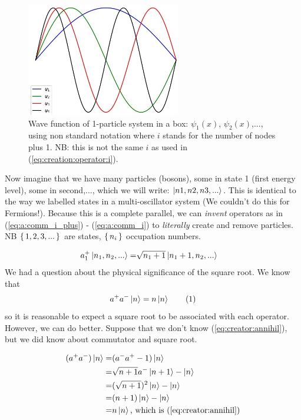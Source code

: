 \documentclass[]{article}
\newcommand\numberthis{\addtocounter{equation}{1}\tag{\theequation}}
\begin{document}
\begin{figure}[H]
	\begin{center}
		\caption[Wave function of 1-particle system in a box]{Wave function of 1-particle system in a box: $\psi_1(x)$, $\psi_2(x)$,..., using non standard notation where $i$ stands for the number of nodes plus 1. NB: this is not the same $i$ as used in (\ref{eq:creation:operator:i}).}\label{fig:aqm-6-sine}
		\includegraphics[width=0.6\textwidth]{aqm-6-sine}
	\end{center}
\end{figure}

Now imagine that we have many particles (bosons), some in state 1 (first energy level), some in second,..., which we will write: $\ket{n1,n2,n3,...}$. This is identical to the way we labelled states in a multi-oscillator system (We couldn't do this for Fermions!).  Because this is a complete parallel, we can \emph{invent} operators as in (\ref{eq:a:comm_i_plus}) - (\ref{eq:a:comm_i}) to \emph{literally} create and remove particles. NB $\set{1,2,3,...}$ are states, $\set{n_i}$ occupation numbers.

\begin{align*}
	a_1^+\ket{n_1,n_2,...} =& \sqrt{n_1+1} \ket{n_1+1,n_2,...}
\end{align*}
We had a question about the physical significance of the square root. We know that
\begin{align*}
	a^+a^-\ket{n} = n \ket{n} \numberthis \label{eq:creator:annihil}
\end{align*}
so it is reasonable to expect a square root to be associated with each operator. However, we can do better. Suppose that we don't know (\ref{eq:creator:annihil}), but we did know about commutator and square root.

\begin{align*}
	(a^+a^-)\ket{n}=&(a^-a^+-1)\ket{n}\\
	=&\sqrt{n+1}a^-\ket{n+1}-\ket{n}\\
	=&(\sqrt{n+1})^2\ket{n}-\ket{n}\\
	=&(n+1)\ket{n}-\ket{n}\\
	=&n\ket{n} \text{, which is  (\ref{eq:creator:annihil})}
\end{align*}
\end{document}
